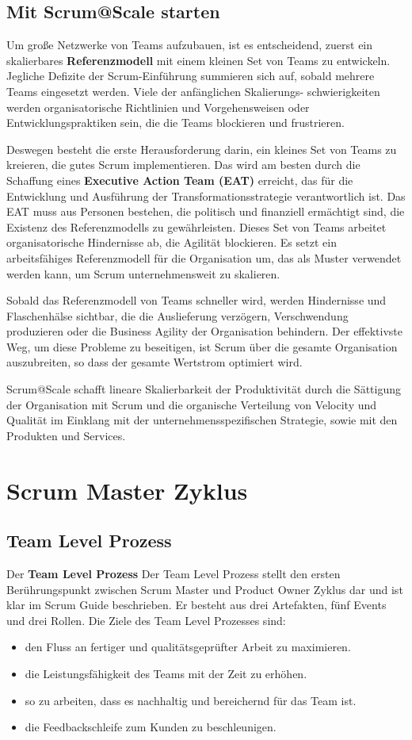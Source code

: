 \documentclass[12pt,a4paper,parskip=full]{scrartcl}
\begin{document}
\subsection{Mit Scrum@Scale starten}
Um große Netzwerke von Teams aufzubauen, ist es entscheidend, zuerst ein
skalierbares \textbf{Referenzmodell} mit einem kleinen Set von Teams zu
entwickeln. Jegliche Defizite der Scrum-Einführung summieren sich auf, sobald
mehrere Teams eingesetzt werden. Viele der anfänglichen Skalierungs-
schwierigkeiten werden organisatorische Richtlinien und Vorgehensweisen oder
Entwicklungspraktiken sein, die die Teams blockieren und frustrieren.

Deswegen besteht die erste Herausforderung darin, ein kleines Set von Teams
zu kreieren, die gutes Scrum implementieren. Das wird am besten durch die
Schaffung eines \textbf{Executive Action Team (EAT)} erreicht, das für die
Entwicklung und Ausführung der Transformationsstrategie verantwortlich ist.
Das EAT muss aus Personen bestehen, die politisch und finanziell ermächtigt
sind, die Existenz des Referenzmodells zu gewährleisten. Dieses Set von Teams
arbeitet organisatorische Hindernisse ab, die Agilität blockieren. Es setzt
ein arbeitsfähiges Referenzmodell für die Organisation um, das als Muster
 verwendet werden kann, um Scrum unternehmensweit zu skalieren.

Sobald das Referenzmodell von Teams schneller wird, werden Hindernisse und
Flaschenhälse sichtbar, die die Auslieferung verzögern, Verschwendung produzieren
oder die Business Agility der Organisation behindern. Der effektivste Weg, um
diese Probleme zu beseitigen, ist Scrum über die gesamte Organisation
auszubreiten, so dass der gesamte Wertstrom optimiert wird.

Scrum@Scale schafft lineare Skalierbarkeit der Produktivität durch die
Sättigung der Organisation mit Scrum und die organische Verteilung von Velocity
und Qualität im Einklang mit der unternehmensspezifischen Strategie, sowie mit den
Produkten und Services.

\section{Scrum Master Zyklus}
\subsection{Team Level Prozess}
Der \textbf{Team Level Prozess} Der Team Level Prozess stellt den ersten Berührungspunkt
zwischen Scrum Master und Product Owner Zyklus dar und ist klar im Scrum Guide beschrieben.
Er besteht aus drei Artefakten, fünf Events und drei Rollen.
Die Ziele des Team Level Prozesses sind:
\begin{itemize}
\item den Fluss an fertiger und qualitätsgeprüfter Arbeit zu maximieren.
\item die Leistungsfähigkeit des Teams mit der Zeit zu erhöhen.
\item so zu arbeiten, dass es nachhaltig und bereichernd für das Team ist.
\item die Feedbackschleife zum Kunden zu beschleunigen.
\end{itemize}
\end{document}
